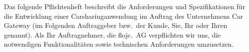 Das folgende Pflichtenheft beschreibt die Anforderungen und Spezifikationen für die Entwicklung einer
Carsharinganwendung im Auftrag des Unternehmens Car Gateway (im Folgenden Auftraggeber bzw.\ der Kunde, Sie, Ihr oder Ihren genannt).
Als Ihr Auftragnehmer, die flojc.\ AG verpflichten wir uns, die notwendigen Funktionalitäten sowie technischen Anforderungen umzusetzen.